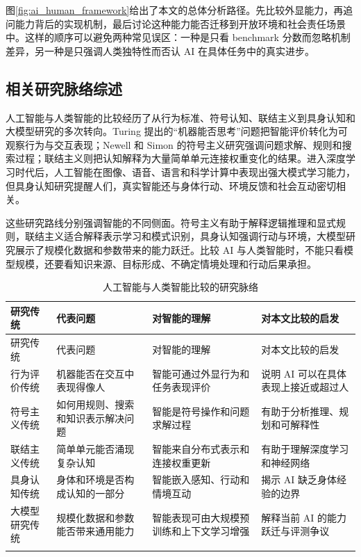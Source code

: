 \documentclass[UTF8,zihao=5,a4paper]{ctexart}
\begin{document}
图\ref{fig:ai_human_framework}给出了本文的总体分析路径。先比较外显能力，再追问能力背后的实现机制，最后讨论这种能力能否迁移到开放环境和社会责任场景中。这样的顺序可以避免两种常见误区：一种是只看 benchmark 分数而忽略机制差异，另一种是只强调人类独特性而否认 AI 在具体任务中的真实进步。

\subsection{相关研究脉络综述}

人工智能与人类智能的比较经历了从行为标准、符号认知、联结主义到具身认知和大模型研究的多次转向。Turing 提出的“机器能否思考”问题把智能评价转化为可观察行为与交互表现\cite{turing1950computing}；Newell 和 Simon 的符号主义研究强调问题求解、规则和搜索过程\cite{newell1972human}；联结主义则把认知解释为大量简单单元连接权重变化的结果。进入深度学习时代后，人工智能在图像、语音、语言和科学计算中表现出强大模式学习能力，但具身认知研究提醒人们，真实智能还与身体行动、环境反馈和社会互动密切相关\cite{varela1991embodied,clark1997being}。

这些研究路线分别强调智能的不同侧面。符号主义有助于解释逻辑推理和显式规则，联结主义适合解释表示学习和模式识别，具身认知强调行动与环境，大模型研究展示了规模化数据和参数带来的能力跃迁。比较 AI 与人类智能时，不能只看模型规模，还要看知识来源、目标形成、不确定情境处理和行动后果承担。

\begin{longtable}{p{2.8cm}p{3.0cm}p{4.2cm}p{4.0cm}}
\toprule
研究传统 & 代表问题 & 对智能的理解 & 对本文比较的启发 \\
\midrule
\endfirsthead
\toprule
研究传统 & 代表问题 & 对智能的理解 & 对本文比较的启发 \\
\midrule
\endhead
行为评价传统 & 机器能否在交互中表现得像人 & 智能可通过外显行为和任务表现评价 & 说明 AI 可以在具体表现上接近或超过人 \\
符号主义传统 & 如何用规则、搜索和知识表示解决问题 & 智能是符号操作和问题求解过程 & 有助于分析推理、规划和可解释性 \\
联结主义传统 & 简单单元能否涌现复杂认知 & 智能来自分布式表示和连接权重更新 & 有助于理解深度学习和神经网络 \\
具身认知传统 & 身体和环境是否构成认知的一部分 & 智能嵌入感知、行动和情境互动 & 揭示 AI 缺乏身体经验的边界 \\
大模型研究传统 & 规模化数据和参数能否带来通用能力 & 智能表现可由大规模预训练和上下文学习增强 & 解释当前 AI 的能力跃迁与评测争议 \\
\bottomrule
\caption{人工智能与人类智能比较的研究脉络}
\label{tab:ai_human_literature}\\
\end{longtable}
\end{document}
